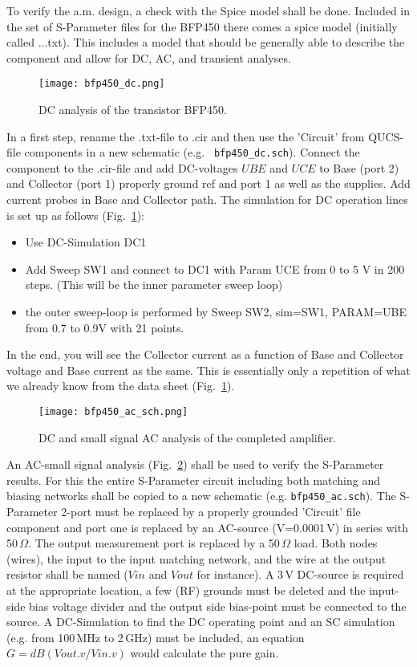 
To verify the a.m. design, a check with the Spice model shall be
done. Included in the set of S-Parameter files for the BFP450 there
comes a spice model (initially called ...txt). This includes a model
that should be generally able to describe the component and allow for
DC, AC, and transient analyses. 

\begin{figure}
  \centering
  {\texttt{[image: bfp450\_dc.png]}}
  \caption{DC analysis of the transistor BFP450.}
  \label{fig:bfp450_dc}
\end{figure}

In a first step, rename the .txt-file to .cir and then use the
'Circuit' from QUCS-file components in a new schematic (e.g. \texttt{
  bfp450\_dc.sch}). Connect the component to the .cir-file and add 
DC-voltages $UBE$ and $UCE$ to Base (port 2) and Collector (port 1)
properly ground ref and port 1 as well as the supplies. Add current
probes in Base and Collector path. The simulation for DC operation
lines is set up as follows (Fig.~\ref{fig:bfp450_dc}):
\begin{itemize}
\item Use DC-Simulation DC1
\item Add Sweep SW1 and connect to DC1 with Param UCE from 0 to 5 V in
  200 steps. (This will be the inner parameter sweep loop)
\item the outer sweep-loop is performed by Sweep SW2, sim=SW1,
  PARAM=UBE from 0.7 to 0.9V with 21 points.
\end{itemize}
In the end, you will see the Collector current as a function of Base
and Collector voltage and Base current as the same. This is
essentially only a repetition of what we already know from the data
sheet (Fig.~\ref{fig:bfp450_dc}).

\begin{figure}
  \centering
  {\texttt{[image: bfp450\_ac\_sch.png]}}
  \caption{DC and small signal AC analysis of the completed amplifier.}
  \label{fig:bfp450_ac_sch}
\end{figure}

An AC-small signal analysis (Fig.~\ref{fig:bfp450_ac_sch}) shall be
used to verify the S-Parameter results. For this the entire
S-Parameter circuit including both matching and biasing networks shall
be copied to a new schematic (e.g. \texttt{bfp450\_ac.sch}). The
S-Parameter 2-port must be replaced by a properly grounded 'Circuit'
file component and port one is replaced by an AC-source (V=0.0001\,V)
in series with 50\,$\Omega$. The output measurement port is replaced
by a 50\,$\Omega$ load. Both nodes (wires), the input to the input
matching network, and the wire at the output resistor shall be named
($Vin$ and $Vout$ for instance). A 3\,V DC-source is required at the
appropriate location, a few (RF) grounds must be deleted and the
input-side bias voltage divider and the output side bias-point must be
connected to the source. A DC-Simulation to find the DC operating
point and an SC simulation (e.g. from 100\,MHz to 2\,GHz) must be
included, an equation $G=dB(Vout.v/Vin.v)$ would calculate the pure
gain.

